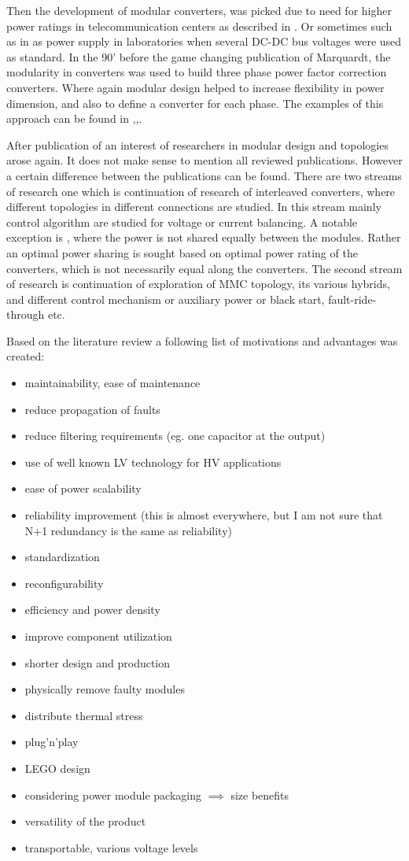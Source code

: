 \documentclass[]{scrartcl}
\begin{document}
Then the development of modular converters, was picked due to need for higher power ratings in telecommunication centers as described in \cite{Nuechteriein}.  Or sometimes such as in \cite{Bishop} as power supply in laboratories when several DC-DC bus voltages were used as standard.  In the 90' before the game changing publication of Marquardt, the modularity in converters was used to build three phase power factor correction converters. Where again modular design helped to increase flexibility in power dimension, and also to define a converter for each phase. The examples of this approach can be found in \cite{Ho1998},\cite{Hui},\cite{Ho2000}.

After publication of \cite{Marquardt2002} an interest of researchers in modular design and topologies arose again. It does not make sense to mention all reviewed publications. However a certain difference between the publications can be found. There are two streams of research one which is continuation of research of interleaved converters, where different topologies in different connections are studied. In this stream mainly control algorithm are studied for voltage or current balancing. A notable exception is \cite{Dc-dc2016}, where the power is not shared equally between the modules. Rather an optimal power sharing is sought based on optimal power rating of the converters, which is not necessarily equal along the converters. The second stream of research is continuation of exploration of MMC topology, its various hybrids, and different control mechanism or auxiliary power or black start, fault-ride-through etc.

Based on the literature review a following list of motivations and advantages was created:
\begin{itemize}
	\item maintainability, ease of maintenance
	\item reduce propagation of faults
	\item reduce filtering requirements (eg. one capacitor at the output)
	\item use of well known LV technology for HV applications 
	\item ease of power scalability
	\item reliability improvement (this is almost everywhere, but I am not sure that N+1 redundancy is the same as reliability)
	\item standardization
	\item reconfigurability 
	\item efficiency and power density
	\item improve component utilization
	\item shorter design and production
	\item physically remove faulty modules
	\item distribute thermal stress
	\item plug'n'play
	\item LEGO design
	\item considering power module packaging $\implies$ size benefits
	\item versatility of the product
	\item transportable, various voltage levels
\end{itemize}                   
\newpage
\end{document}
